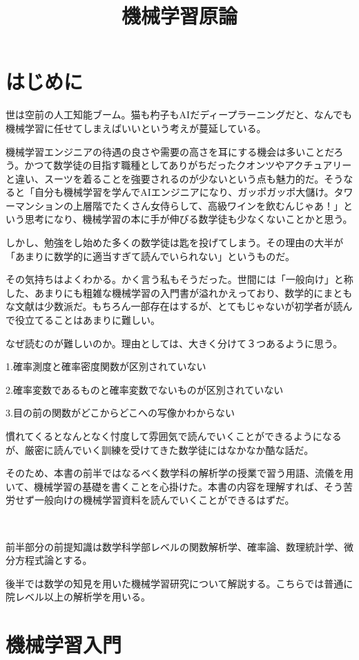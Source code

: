 \documentclass{jsarticle}
\title{機械学習原論}
\author{}
\begin{document}
\maketitle
\section{はじめに}
世は空前の人工知能ブーム。猫も杓子もAIだディープラーニングだと、なんでも機械学習に任せてしまえばいいという考えが蔓延している。

機械学習エンジニアの待遇の良さや需要の高さを耳にする機会は多いことだろう。かつて数学徒の目指す職種としてありがちだったクオンツやアクチュアリーと違い、スーツを着ることを強要されるのが少ないという点も魅力的だ。そうなると「自分も機械学習を学んでAIエンジニアになり、ガッポガッポ大儲け。タワーマンションの上層階でたくさん女侍らして、高級ワインを飲むんじゃあ！」という思考になり、機械学習の本に手が伸びる数学徒も少なくないことかと思う。

しかし、勉強をし始めた多くの数学徒は匙を投げてしまう。その理由の大半が「あまりに数学的に適当すぎて読んでいられない」というものだ。

その気持ちはよくわかる。かく言う私もそうだった。世間には「一般向け」と称した、あまりにも粗雑な機械学習の入門書が溢れかえっており、数学的にまともな文献は少数派だ。もちろん一部存在はするが、とてもじゃないが初学者が読んで役立てることはあまりに難しい。

なぜ読むのが難しいのか。理由としては、大きく分けて３つあるように思う。

1.確率測度と確率密度関数が区別されていない

2.確率変数であるものと確率変数でないものが区別されていない

3.目の前の関数がどこからどこへの写像かわからない

慣れてくるとなんとなく忖度して雰囲気で読んでいくことができるようになるが、厳密に読んでいく訓練を受けてきた数学徒にはなかなか酷な話だ。

そのため、本書の前半ではなるべく数学科の解析学の授業で習う用語、流儀を用いて、機械学習の基礎を書くことを心掛けた。本書の内容を理解すれば、そう苦労せず一般向けの機械学習資料を読んでいくことができるはずだ。

　

前半部分の前提知識は数学科学部レベルの関数解析学、確率論、数理統計学、微分方程式論とする。

後半では数学の知見を用いた機械学習研究について解説する。こちらでは普通に院レベル以上の解析学を用いる。

\newpage
\section{機械学習入門}
\end{document}
